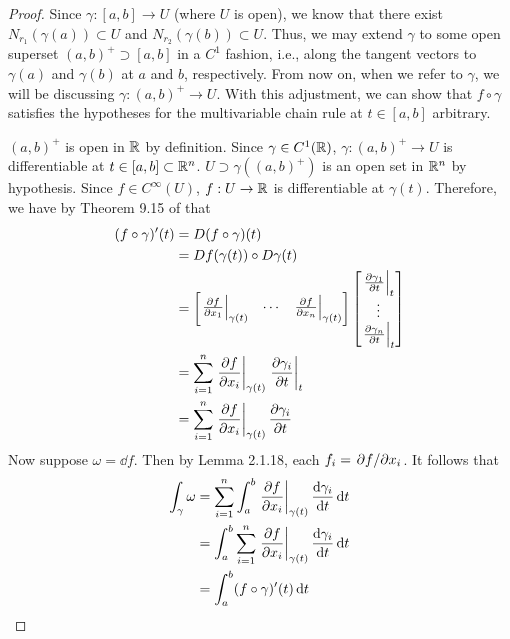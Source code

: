 \documentclass[../psets.tex]{subfiles}
\begin{document}
\begin{enumerate}[label={\textbf{2.1.\roman*.}}]
\begin{proof}
        Since $\gamma:[a,b]\to U$ (where $U$ is open), we know that there exist $N_{r_1}(\gamma(a))\subset U$ and $N_{r_2}(\gamma(b))\subset U$. Thus, we may extend $\gamma$ to some open superset $(a,b)^+\supset[a,b]$ in a $C^1$ fashion, i.e., along the tangent vectors to $\gamma(a)$ and $\gamma(b)$ at $a$ and $b$, respectively. From now on, when we refer to $\gamma$, we will be discussing $\gamma:(a,b)^+\to U$. With this adjustment, we can show that $f\circ\gamma$ satisfies the hypotheses for the multivariable chain rule at $t\in[a,b]$ arbitrary.\par
        $(a,b)^+$ is open in $\mathbb{R}$ by definition. Since $\gamma\in C^1(\mathbb{R})$, $\gamma:(a,b)^+\to U$ is differentiable at $t\in[a,b]\subset\mathbb{R}^n$. $U\supset\gamma((a,b)^+)$ is an open set in $\mathbb{R}^n$ by hypothesis. Since $f\in C^\infty(U)$, $f:U\to\mathbb{R}$ is differentiable at $\gamma(t)$. Therefore, we have by Theorem 9.15 of \textcite{bib:Rudin} that
        \begin{align*}
            (f\circ\gamma)'(t) &= D(f\circ\gamma)(t)\\
            &= Df(\gamma(t))\circ D\gamma(t)\\
            &=
            \begin{bmatrix}
                \eval{\pdv{f}{x_1}}_{\gamma(t)} & \cdots & \eval{\pdv{f}{x_n}}_{\gamma(t)}\\
            \end{bmatrix}
            \begin{bmatrix}
                \eval{\pdv{\gamma_1}{t}}_t\\
                \vdots\\
                \eval{\pdv{\gamma_n}{t}}_t\\
            \end{bmatrix}\\
            &= \sum_{i=1}^n\eval{\pdv{f}{x_i}}_{\gamma(t)}\eval{\pdv{\gamma_i}{t}}_t\\
            &= \sum_{i=1}^n\eval{\pdv{f}{x_i}}_{\gamma(t)}\pdv{\gamma_i}{t}
        \end{align*}
        Now suppose $\omega=\dd f$. Then by Lemma 2.1.18, each $f_i=\pdv*{f}{x_i}$. It follows that
        \begin{align*}
            \int_\gamma\omega &= \sum_{i=1}^n\int_a^b\eval{\pdv{f}{x_i}}_{\gamma(t)}\dv{\gamma_i}{t}\dd{t}\\
            &= \int_a^b\sum_{i=1}^n\eval{\pdv{f}{x_i}}_{\gamma(t)}\dv{\gamma_i}{t}\dd{t}\\
            &= \int_a^b(f\circ\gamma)'(t)\dd{t}\\

\end{align*}
\end{proof}
\end{enumerate}
\end{document}
